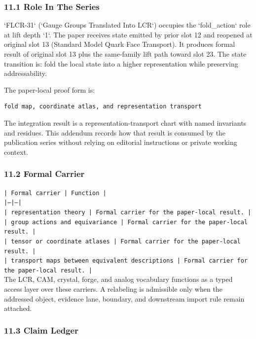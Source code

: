 \documentclass[11pt]{article}
\begin{document}
\subsubsection*{11.1 Role In The Series}

`FLCR-31` (`Gauge Groups Translated Into LCR`) occupies the `fold\_action` role at lift depth `1`.
The paper receives state emitted by prior slot 12 and reopened at original slot 13 (Standard Model Quark Face Transport). It produces formal result of original slot 13 plus the same-family lift path toward slot 23. The state transition is:
fold the local state into a higher representation while preserving addressability.

The paper-local proof form is:

\begin{verbatim}
fold map, coordinate atlas, and representation transport
\end{verbatim}

The integration result is a representation-transport chart with named invariants and residues. This addendum records how that result is
consumed by the publication series without relying on editorial instructions or
private working context.

\subsubsection*{11.2 Formal Carrier}

\noindent\texttt{| Formal carrier | Function |}\\
\noindent\texttt{|---|---|}\\
\noindent\texttt{| representation theory | Formal carrier for the paper-local result. |}\\
\noindent\texttt{| group actions and equivariance | Formal carrier for the paper-local result. |}\\
\noindent\texttt{| tensor or coordinate atlases | Formal carrier for the paper-local result. |}\\
\noindent\texttt{| transport maps between equivalent descriptions | Formal carrier for the paper-local result. |}\\

The LCR, CAM, crystal, forge, and analog vocabulary functions as a typed access
layer over these carriers. A relabeling is admissible only when the addressed
object, evidence lane, boundary, and downstream import rule remain attached.

\subsubsection*{11.3 Claim Ledger}
\end{document}
